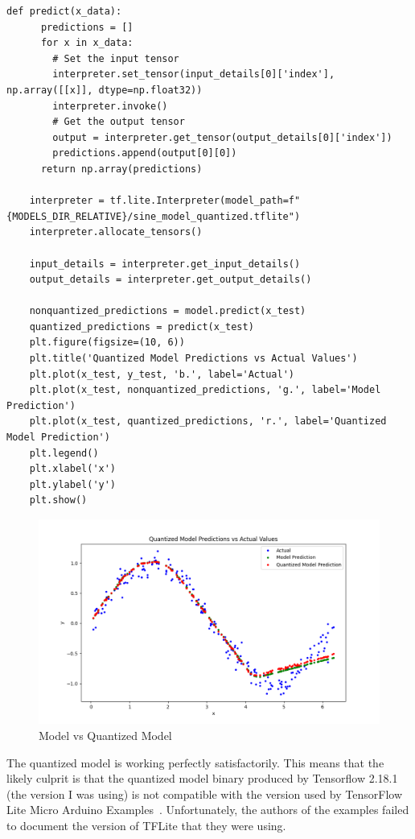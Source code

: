 \documentclass{article}
\begin{document}
    \begin{lstlisting}[label={lst:quant}]
    def predict(x_data):
      predictions = []
      for x in x_data:
        # Set the input tensor
        interpreter.set_tensor(input_details[0]['index'], np.array([[x]], dtype=np.float32))
        interpreter.invoke()
        # Get the output tensor
        output = interpreter.get_tensor(output_details[0]['index'])
        predictions.append(output[0][0])
      return np.array(predictions)

    interpreter = tf.lite.Interpreter(model_path=f"{MODELS_DIR_RELATIVE}/sine_model_quantized.tflite")
    interpreter.allocate_tensors()

    input_details = interpreter.get_input_details()
    output_details = interpreter.get_output_details()

    nonquantized_predictions = model.predict(x_test)
    quantized_predictions = predict(x_test)
    plt.figure(figsize=(10, 6))
    plt.title('Quantized Model Predictions vs Actual Values')
    plt.plot(x_test, y_test, 'b.', label='Actual')
    plt.plot(x_test, nonquantized_predictions, 'g.', label='Model Prediction')
    plt.plot(x_test, quantized_predictions, 'r.', label='Quantized Model Prediction')
    plt.legend()
    plt.xlabel('x')
    plt.ylabel('y')
    plt.show()
    \end{lstlisting}

    \begin{figure}[!htbp]
        \centerline{\includegraphics[width=0.8\columnwidth]{quantized}}
        \caption{Model vs Quantized Model}
        \label{fig:quantized}
    \end{figure}

    The quantized model is working perfectly satisfactorily.
    This means that the likely culprit is that the quantized model binary produced by Tensorflow 2.18.1 (the version I was using) is not compatible with the version used by TensorFlow Lite Micro Arduino Examples~\cite{tfliteMicroArduino}.
    Unfortunately, the authors of the examples failed to document the version of TFLite that they were using.
\end{document}
